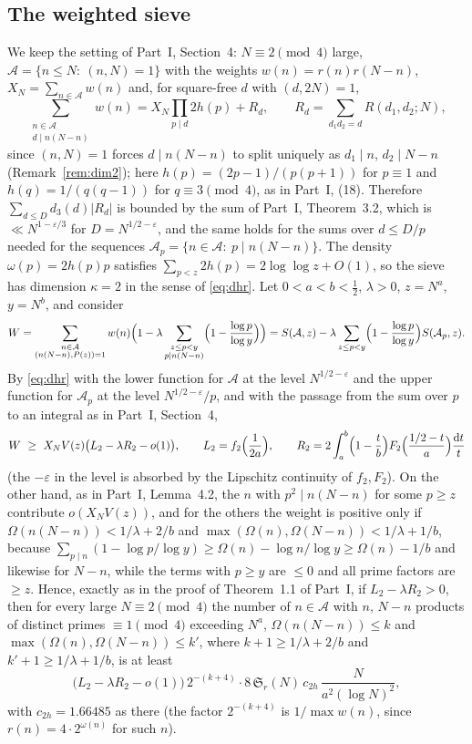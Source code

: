 ﻿\documentclass[11pt]{amsart}
\theoremstyle{remark}
\newcommand{\cA}{\mathcal{A}}
\newcommand{\Sg}{\mathfrak{S}}
\newcommand{\e}{\varepsilon}
\newcommand{\dd}{\mathrm{d}}
\begin{document}
\subsection{The weighted sieve}\label{subsec:weighted}
We keep the setting of Part~I, Section~4: $N\equiv2\pmod4$ large, $\cA=\{n\le N:\ (n,N)=1\}$ with the weights $w(n)=r(n)r(N-n)$, $X_N=\sum_{n\in\cA}w(n)$ and, for square-free $d$ with $(d,2N)=1$,
\[
\sum_{\substack{n\in\cA\\ d\mid n(N-n)}}w(n)=X_N\prod_{p\mid d}2h(p)+R_d,\qquad R_d=\sum_{d_1d_2=d}R(d_1,d_2;N),
\]
since $(n,N)=1$ forces $d\mid n(N-n)$ to split uniquely as $d_1\mid n$, $d_2\mid N-n$ (Remark~\ref{rem:dim2}); here $h(p)=(2p-1)/(p(p+1))$ for $p\equiv1$ and $h(q)=1/(q(q-1))$ for $q\equiv3\pmod4$, as in Part~I, (18). Therefore $\sum_{d\le D}d_3(d)|R_d|$ is bounded by the sum of Part~I, Theorem~3.2, which is $\ll N^{1-\e/3}$ for $D=N^{1/2-\e}$, and the same holds for the sums over $d\le D/p$ needed for the sequences $\cA_p=\{n\in\cA:\ p\mid n(N-n)\}$. The density $\omega(p)=2h(p)p$ satisfies $\sum_{p<z}2h(p)=2\log\log z+O(1)$, so the sieve has dimension $\kappa=2$ in the sense of \eqref{eq:dhr}. Let $0<a<b<\frac12$, $\lambda>0$, $z=N^a$, $y=N^b$, and consider
\[
W=\sum_{\substack{n\in\cA\\ (n(N-n),P(z))=1}}w(n)\Bigl(1-\lambda\sum_{\substack{z\le p<y\\ p\mid n(N-n)}}\Bigl(1-\frac{\log p}{\log y}\Bigr)\Bigr)=S(\cA,z)-\lambda\sum_{z\le p<y}\Bigl(1-\frac{\log p}{\log y}\Bigr)S(\cA_p,z).
\]
By \eqref{eq:dhr} with the lower function for $\cA$ at the level $N^{1/2-\e}$ and the upper function for $\cA_p$ at the level $N^{1/2-\e}/p$, and with the passage from the sum over $p$ to an integral as in Part~I, Section~4,
\begin{equation}\label{eq:W2}
W\ \ge\ X_NV(z)\bigl(L_2-\lambda R_2-o(1)\bigr),\qquad L_2=f_2\Bigl(\frac1{2a}\Bigr),\qquad R_2=2\int_a^b\Bigl(1-\frac tb\Bigr)F_2\Bigl(\frac{1/2-t}{a}\Bigr)\frac{\dd t}t
\end{equation}
(the $-\e$ in the level is absorbed by the Lipschitz continuity of $f_2,F_2$). On the other hand, as in Part~I, Lemma~4.2, the $n$ with $p^2\mid n(N-n)$ for some $p\ge z$ contribute $o(X_NV(z))$, and for the others the weight is positive only if $\Omega(n(N-n))<1/\lambda+2/b$ and $\max(\Omega(n),\Omega(N-n))<1/\lambda+1/b$, because $\sum_{p\mid n}(1-\log p/\log y)\ge\Omega(n)-\log n/\log y\ge\Omega(n)-1/b$ and likewise for $N-n$, while the terms with $p\ge y$ are $\le0$ and all prime factors are $\ge z$. Hence, exactly as in the proof of Theorem~1.1 of Part~I, if $L_2-\lambda R_2>0$, then for every large $N\equiv2\pmod4$ the number of $n\in\cA$ with $n$, $N-n$ products of distinct primes $\equiv1\pmod4$ exceeding $N^a$, $\Omega(n(N-n))\le k$ and $\max(\Omega(n),\Omega(N-n))\le k'$, where $k+1\ge1/\lambda+2/b$ and $k'+1\ge1/\lambda+1/b$, is at least
\begin{equation}\label{eq:count2}
\bigl(L_2-\lambda R_2-o(1)\bigr)\,2^{-(k+4)}\cdot8\,\Sg_r(N)\,c_{2h}\,\frac{N}{a^2(\log N)^2},
\end{equation}
with $c_{2h}=1.66485$ as there (the factor $2^{-(k+4)}$ is $1/\max w(n)$, since $r(n)=4\cdot2^{\omega(n)}$ for such $n$).
\end{document}
